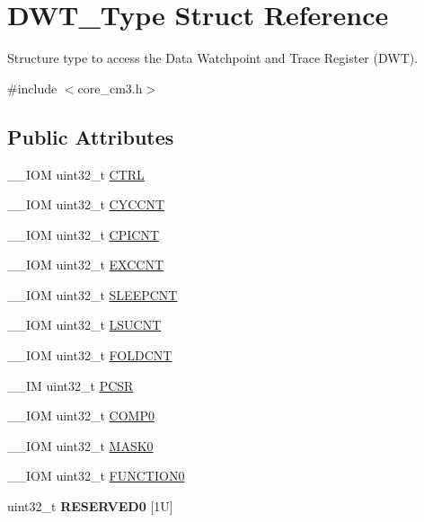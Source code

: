 \hypertarget{struct_d_w_t___type}{\section{D\-W\-T\-\_\-\-Type Struct Reference}
\label{struct_d_w_t___type}
}


Structure type to access the Data Watchpoint and Trace Register (D\-W\-T).  




{\ttfamily \#include $<$core\-\_\-cm3.\-h$>$}

\subsection*{Public Attributes}
\begin{DoxyCompactItemize}
\item 
\-\_\-\-\_\-\-I\-O\-M uint32\-\_\-t \hyperlink{struct_d_w_t___type_add790c53410023b3b581919bb681fe2a}{C\-T\-R\-L}
\item 
\-\_\-\-\_\-\-I\-O\-M uint32\-\_\-t \hyperlink{struct_d_w_t___type_a102eaa529d9098242851cb57c52b42d9}{C\-Y\-C\-C\-N\-T}
\item 
\-\_\-\-\_\-\-I\-O\-M uint32\-\_\-t \hyperlink{struct_d_w_t___type_a2c08096c82abe245c0fa97badc458154}{C\-P\-I\-C\-N\-T}
\item 
\-\_\-\-\_\-\-I\-O\-M uint32\-\_\-t \hyperlink{struct_d_w_t___type_a9fe20c16c5167ca61486caf6832686d1}{E\-X\-C\-C\-N\-T}
\item 
\-\_\-\-\_\-\-I\-O\-M uint32\-\_\-t \hyperlink{struct_d_w_t___type_a416a54e2084ce66e5ca74f152a5ecc70}{S\-L\-E\-E\-P\-C\-N\-T}
\item 
\-\_\-\-\_\-\-I\-O\-M uint32\-\_\-t \hyperlink{struct_d_w_t___type_acc05d89bdb1b4fe2fa499920ec02d0b1}{L\-S\-U\-C\-N\-T}
\item 
\-\_\-\-\_\-\-I\-O\-M uint32\-\_\-t \hyperlink{struct_d_w_t___type_a1cfc48384ebd8fd8fb7e5d955aae6c97}{F\-O\-L\-D\-C\-N\-T}
\item 
\-\_\-\-\_\-\-I\-M uint32\-\_\-t \hyperlink{struct_d_w_t___type_a6353ca1d1ad9bc1be05d3b5632960113}{P\-C\-S\-R}
\item 
\-\_\-\-\_\-\-I\-O\-M uint32\-\_\-t \hyperlink{struct_d_w_t___type_a61c2965af5bc0643f9af65620b0e67c9}{C\-O\-M\-P0}
\item 
\-\_\-\-\_\-\-I\-O\-M uint32\-\_\-t \hyperlink{struct_d_w_t___type_a821eb5e71f340ec077efc064cfc567db}{M\-A\-S\-K0}
\item 
\-\_\-\-\_\-\-I\-O\-M uint32\-\_\-t \hyperlink{struct_d_w_t___type_a579ae082f58a0317b7ef029b20f52889}{F\-U\-N\-C\-T\-I\-O\-N0}
\item 
\hypertarget{struct_d_w_t___type_aef6d91fd3df2a013546764fe0e4ad7a8}{uint32\-\_\-t {\bfseries R\-E\-S\-E\-R\-V\-E\-D0} \mbox{[}1\-U\mbox{]}}\label{struct_d_w_t___type_aef6d91fd3df2a013546764fe0e4ad7a8}


\end{DoxyCompactItemize}
